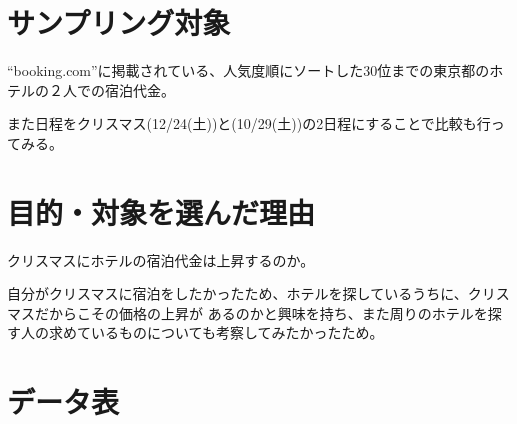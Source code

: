 \documentclass[11pt,a4j]{jsarticle}
\begin{document}


\section{サンプリング対象}

``booking.com''に掲載されている、人気度順にソートした30位までの東京都のホテルの２人での宿泊代金。

また日程をクリスマス(12/24(土))と(10/29(土))の2日程にすることで比較も行ってみる。


\section{目的・対象を選んだ理由}
クリスマスにホテルの宿泊代金は上昇するのか。

自分がクリスマスに宿泊をしたかったため、ホテルを探しているうちに、クリスマスだからこその価格の上昇が
あるのかと興味を持ち、また周りのホテルを探す人の求めているものについても考察してみたかったため。

\section{データ表}
\end{document}
